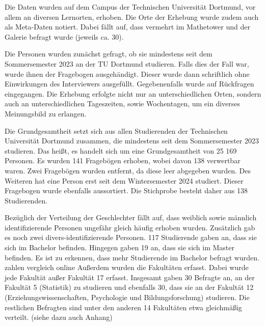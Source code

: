 \documentclass[11pt, a4paper]{article}
\begin{document}
Die Daten wurden auf dem Campus der Technischen Universität Dortmund, vor allem an diversen Lernorten, erhoben. Die Orte der Erhebung wurde zudem auch als Meta-Daten notiert. Dabei fällt auf, dass vermehrt im Mathetower und der Galerie befragt wurde (jeweils ca. 30).

Die Personen wurden zunächst gefragt, ob sie mindestens seit dem Sommersemester 2023 an der TU Dortmund studieren. Falls dies der Fall war, wurde ihnen der Fragebogen ausgehändigt. Dieser wurde dann schriftlich ohne Einwirkungen des Interviewers ausgefüllt. Gegebenenfalls wurde auf Rückfragen eingegangen.
Die Erhebung erfolgte nicht nur an unterschiedlichen Orten, sondern auch an unterschiedlichen Tageszeiten, sowie Wochentagen, um ein diverses Meinungsbild zu erlangen.

Die Grundgesamtheit setzt sich aus allen Studierenden der Technischen Universität Dortmund zusammen, die mindestens seit dem Sommersemester 2023 studieren. Das heißt, es handelt sich um eine Grundgesamtheit von 25 169 Personen. 
Es wurden 141 Fragebögen erhoben, wobei davon 138 verwertbar waren. Zwei Fragebögen wurden entfernt, da diese leer abgegeben wurden. Des Weiteren hat eine Person erst seit dem Wintersemester 2024 studiert. Dieser Fragebogen wurde ebenfalls aussortiert.
Die Stichprobe besteht daher aus 138 Studierenden.

Bezüglich der Verteilung der Geschlechter fällt auf, dass weiblich sowie männlich identifizierende Personen ungefähr gleich häufig erhoben wurden. Zusätzlich gab es noch zwei divers-identifizierende Personen. 
117 Studierende gaben an, dass sie sich im Bachelor befinden. Hingegen gaben 19 an, dass sie sich im Master befinden. Es ist zu erkennen, dass mehr Studierende im Bachelor befragt wurden. zahlen vergleich online
Außerdem wurden die Fakultäten erfasst. Dabei wurde jede Fakultät außer Fakultät 17 erfasst. Insgesamt gaben 30 Befragte an, an der Fakultät 5 (Statistik) zu studieren und ebenfalls 30, dass sie an der Fakultät 12 (Erziehungswissenschaften, Psychologie und Bildungsforschung) studieren. Die restlichen Befragten sind unter den anderen 14 Fakultäten etwa gleichmäßig verteilt. (siehe dazu auch Anhang)
\end{document}
